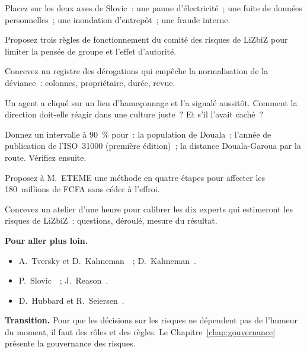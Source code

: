 \begin{boxexo}[title={\ding{45}\quad Exercice~2.4. Slovic \niveaumoyen}]
Placez sur les deux axes de Slovic~: une panne d'électricité~; une fuite
de données personnelles~; une inondation d'entrepôt~; une fraude interne.
\end{boxexo}

\begin{boxexo}[title={\ding{45}\quad Exercice~2.5. Le comité \niveaumoyen}]
Proposez trois règles de fonctionnement du comité des risques de LiZbiZ
pour limiter la pensée de groupe et l'effet d'autorité.
\end{boxexo}

\begin{boxexo}[title={\ding{45}\quad Exercice~2.6. Dérogations \niveaumoyen}]
Concevez un registre des dérogations qui empêche la normalisation de la
déviance~: colonnes, propriétaire, durée, revue.
\end{boxexo}

\begin{boxexo}[title={\ding{45}\quad Exercice~2.7. Culture juste \niveaumoyen}]
Un agent a cliqué sur un lien d'hameçonnage et l'a signalé aussitôt.
Comment la direction doit-elle réagir dans une culture juste~? Et s'il
l'avait caché~?
\end{boxexo}

\begin{boxexo}[title={\ding{45}\quad Exercice~2.8. Calibrer \niveaumoyen}]
Donnez un intervalle à 90~\% pour~: la population de Douala~; l'année de
publication de l'ISO~31000 (première édition)~; la distance Douala-Garoua
par la route. Vérifiez ensuite.
\end{boxexo}

\begin{boxexo}[title={\ding{45}\quad Exercice~2.9. Le budget d'avril \niveauexpert}]
Proposez à M.~ETEME une méthode en quatre étapes pour affecter les
180~millions de FCFA sans céder à l'effroi.
\end{boxexo}

\begin{boxexo}[title={\ding{45}\quad Exercice~2.10. Un atelier \niveauexpert}]
Concevez un atelier d'une heure pour calibrer les dix experts qui
estimeront les risques de LiZbiZ~: questions, déroulé, mesure du
résultat.
\end{boxexo}

\bigskip

\begin{boxinfo}
\textbf{Pour aller plus loin.}
\begin{itemize}
    \item A.~Tversky et D.~Kahneman~\cite{tversky1974}~; D.~Kahneman~\cite{kahneman2011}.
    \item P.~Slovic~\cite{slovic1987}~; J.~Reason~\cite{reason1997}.
    \item D.~Hubbard et R.~Seiersen~\cite{hubbard2016cyber}.
\end{itemize}
\end{boxinfo}

\begin{boxinfo}
\textbf{Transition.} Pour que les décisions sur les risques ne dépendent
pas de l'humeur du moment, il faut des rôles et des règles. Le
Chapitre~\ref{chap:gouvernance} présente la gouvernance des risques.
\end{boxinfo}
